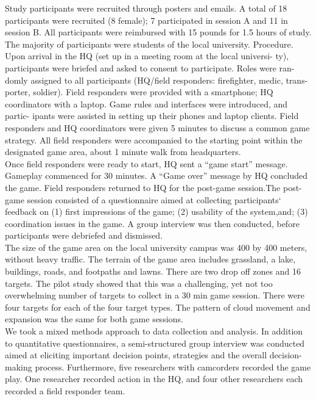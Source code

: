 Study participants were recruited through posters and emails. A total of 18 participants were recruited (8 female); 7 participated in session A and 11 in session B. All participants were reimbursed with 15 pounds for 1.5 hours of study. The majority of participants were students of the local university. Procedure. Upon arrival in the HQ (set up in a meeting room at the local universi- ty), participants were briefed and asked to consent to participate. Roles were ran- domly assigned to all participants (HQ/field responders: firefighter, medic, trans- porter, soldier). Field responders were provided with a smartphone; HQ coordinators with a laptop. Game rules and interfaces were introduced, and partic- ipants were assisted in setting up their phones and laptop clients. Field responders and HQ coordinators were given 5 minutes to discuss a common game strategy. All field responders were accompanied to the starting point within the designated game area, about 1 minute walk from headquarters.\\

Once field responders were ready to start, HQ sent a ``game start'' message. Gameplay commenced for 30 minutes. A ``Game over'' message by HQ concluded the game. Field responders returned to HQ for the post-game session.The post-game session consisted of a questionnaire aimed at collecting participants` feedback on (1) first impressions of the game; (2) usability of the system,and; (3) coordination issues in the game. A group interview was then conducted, before participants were debriefed and dismissed.\\

The size of the game area on the local university campus was 400 by 400 meters, without heavy traffic. The terrain of the game area includes grassland, a lake, buildings, roads, and footpaths and lawns. There are two drop off zones and 16 targets. The pilot study showed that this was a challenging, yet not too overwhelming number of targets to collect in a 30 min game session. There were four targets for each of the four target types. The pattern of cloud movement and expansion was the same for both game sessions.\\

We took a mixed methods approach to data collection and analysis. In addition to quantitative questionnaires, a semi-structured group interview was conducted aimed at eliciting important decision points, strategies and the overall decision-making process. Furthermore, five researchers with camcorders recorded the game play. One researcher recorded action in the HQ, and four other researchers each recorded a field responder team.\\

